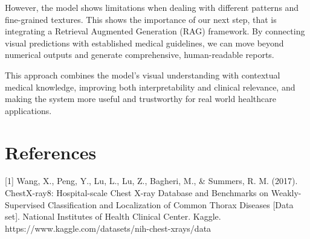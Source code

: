 \documentclass{article}
\begin{document}
However, the model shows limitations when dealing with different patterns and fine-grained textures. This shows the importance of our next step, that is integrating a Retrieval Augmented Generation (RAG) framework. By connecting visual predictions with established medical guidelines, we can move beyond numerical outputs and generate comprehensive, human-readable reports.

This approach combines the model’s visual understanding with contextual medical knowledge, improving both interpretability and clinical relevance, and making the system more useful and trustworthy for real world healthcare applications.


\section*{References}

\medskip



\small


[1] Wang, X., Peng, Y., Lu, L., Lu, Z., Bagheri, M., \& Summers, R. M. (2017). ChestX-ray8: Hospital-scale Chest X-ray Database and Benchmarks on Weakly-Supervised Classification and Localization of Common Thorax Diseases [Data set]. National Institutes of Health Clinical Center. Kaggle. https://www.kaggle.com/datasets/nih-chest-xrays/data




\newpage

\end{document}

